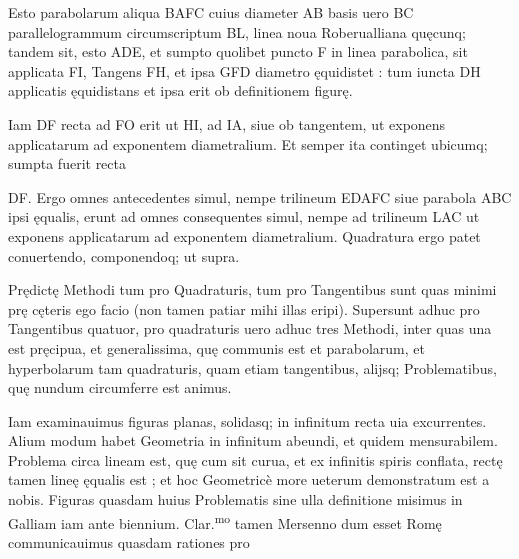 \documentclass[11pt,a4paper]{article}
\begin{document}
Esto parabolarum aliqua BAFC cuius diameter AB basis uero BC parallelogrammum circumscriptum BL, linea noua Roberualliana quęcunq; tandem sit, esto ADE, et sumpto quolibet puncto F in linea parabolica, sit applicata FI, Tangens FH, et ipsa GFD diametro ęquidistet : tum iuncta DH applicatis ęquidistans et ipsa erit ob definitionem figurę.

Iam DF recta ad FO erit ut HI, ad IA, siue ob tangentem, ut exponens applicatarum ad exponentem diametralium. Et semper ita continget ubicumq; sumpta fuerit recta


DF. Ergo omnes antecedentes simul, nempe trilineum EDAFC siue parabola ABC ipsi ęqualis, erunt ad omnes consequentes simul, nempe ad trilineum LAC ut exponens applicatarum ad exponentem diametralium. Quadratura ergo patet conuertendo, componendoq; ut supra.

Prędictę Methodi tum pro Quadraturis, tum pro Tangentibus sunt quas minimi prę cęteris ego facio (non tamen patiar mihi illas eripi). Supersunt adhuc pro Tangentibus quatuor, pro quadraturis uero adhuc tres Methodi, inter quas una est pręcipua, et generalissima, quę communis est et parabolarum, et hyperbolarum tam quadraturis, quam etiam tangentibus, alijsq; Problematibus, quę \struck{\ill{}} nundum circumferre est animus.

Iam examinauimus figuras planas, solidasq; in infinitum recta uia excurrentes. Alium modum habet Geometria in infinitum abeundi, et quidem mensurabilem. Problema circa lineam est, quę cum sit curua, et ex infinitis spiris conflata, rectę tamen lineę ęqualis est ; et hoc Geometricè more ueterum demonstratum est a nobis. Figuras quasdam huius Problematis sine ulla definitione misimus in Galliam iam ante biennium. Clar.\textsuperscript{mo} tamen Mersenno dum esset Romę communicauimus quasdam rationes pro
\end{document}
